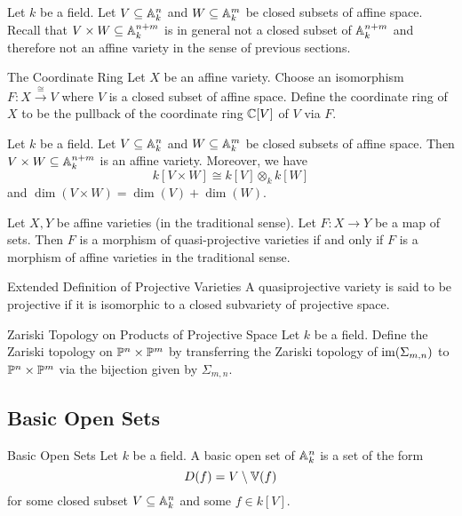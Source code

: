\documentclass[a4paper]{article}
\begin{document}
Let $k$ be a field. Let $V\subseteq\mathbb{A}_k^n$ and $W\subseteq\mathbb{A}_k^m$ be closed subsets of affine space. Recall that $V\times W\subseteq\mathbb{A}_k^{n+m}$ is in general not a closed subset of $\mathbb{A}_k^{n+m}$ and therefore not an affine variety in the sense of previous sections. 

\begin{defn}{The Coordinate Ring}{} Let $X$ be an affine variety. Choose an isomorphism $F:X\overset{\cong}{\longrightarrow}V$ where $V$ is a closed subset of affine space. Define the coordinate ring of $X$ to be the pullback of the coordinate ring $\mathbb{C}[V]$ of $V$ via $F$. 
\end{defn}

\begin{prp}{}{} Let $k$ be a field. Let $V\subseteq\mathbb{A}_k^n$ and $W\subseteq\mathbb{A}_k^m$ be closed subsets of affine space. Then $V\times W\subseteq\mathbb{A}_k^{n+m}$ is an affine variety. Moreover, we have $$k[V\times W]\cong k[V]\otimes_kk[W]$$ and $\dim(V\times W)=\dim(V)+\dim(W)$. 
\end{prp}

\begin{prp}{}{} Let $X,Y$ be affine varieties (in the traditional sense). Let $F:X\to Y$ be a map of sets. Then $F$ is a morphism of quasi-projective varieties if and only if $F$ is a morphism of affine varieties in the traditional sense. 
\end{prp}

\begin{defn}{Extended Definition of Projective Varieties}{} A quasiprojective variety is said to be projective if it is isomorphic to a closed subvariety of projective space. 
\end{defn}

\begin{defn}{Zariski Topology on Products of Projective Space}{} Let $k$ be a field. Define the Zariski topology on $\mathbb{P}^n\times\mathbb{P}^m$ by transferring the Zariski topology of $\operatorname{im}(\Sigma_{m,n})$ to $\mathbb{P}^n\times\mathbb{P}^m$ via the bijection given by $\Sigma_{m,n}$. 
\end{defn}

\subsection{Basic Open Sets}
\begin{defn}{Basic Open Sets}{} Let $k$ be a field. A basic open set of $\mathbb{A}_k^n$ is a set of the form $$D(f)=V\setminus\mathbb{V}(f)$$ for some closed subset $V\subseteq\mathbb{A}_k^n$ and some $f\in k[V]$. 
\end{defn}
\end{document}
